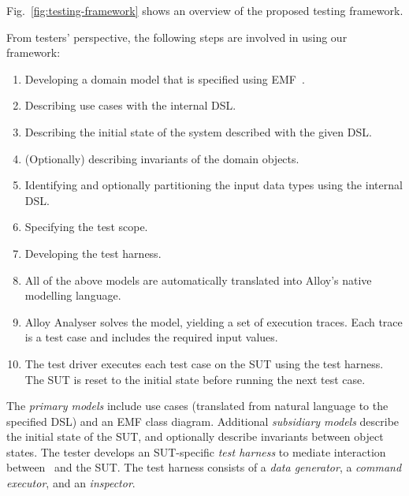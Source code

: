 %
%
\label{sec:framework-overview}
Fig.~\ref{fig:testing-framework} shows an overview of the proposed testing framework.

From testers' perspective, the following steps are involved in using our framework:
\begin{enumerate}
	\item Developing a domain model that is specified using EMF~\cite{EMF}. 
	
	\item Describing use cases with the internal DSL.
	
	\item Describing the initial state of the system described with the given DSL.
	
	\item (Optionally) describing invariants of the domain objects.
	
	\item Identifying and optionally partitioning the input data types using the internal DSL. 
	
	\item Specifying the test scope.
	
	\item Developing the test harness.
	
	\item All of the above models are automatically translated into Alloy's native modelling language.
	
	\item Alloy Analyser solves the model, yielding a set of execution traces. Each trace is a test case and includes the required input values.
	
	\item The test driver executes each test case on the SUT using the test harness. The SUT is reset to the initial state before running the next test case.
\end{enumerate}

The \textit{primary models} include use cases (translated from natural language to the specified DSL) and an EMF class diagram.
Additional \textit{subsidiary models} describe the initial state of the SUT, and optionally describe invariants between object states.
The tester develops an SUT-specific \textit{test harness} to mediate interaction between \this~and the SUT. The test harness consists of a \textit{data generator}, a \textit{command executor}, and an \textit{inspector}.

